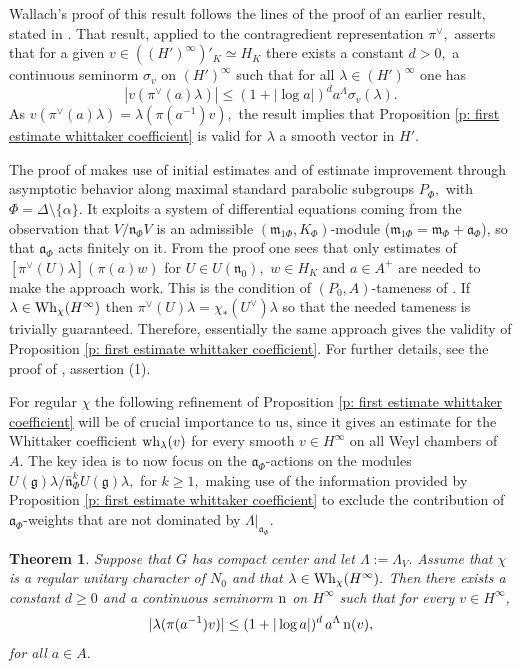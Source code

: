 \documentclass[12pt,a4paper]{article}
\newtheorem{Thm}{Theorem}
\newenvironment{thm}[0]{\begin{Thm}\noindent}%
{\end{Thm}}
\def\ga{\alpha}
\def\gl{\lambda}
\def\gs{\sigma}
\def\gD{\Delta}
\def\got#1{\mathfrak #1}
\def\fa{{\got a}}
\def\fg{{\got g}}
\def\fm{{\got m}}
\def\fn{{\got n}}
\numberwithin{Thm}{section}
\numberwithin{equation}{section}
\def\Wh{{\rm Wh}}
\def\gL{\Lambda}
\numberwithin{equation}{section}
\def\gL{\Lambda}
\def\wh{{\rm wh}}
\def\cchi{\chi}
\def\veec{\vee}%
\begin{document}
Wallach's proof of this result follows the lines of the proof of an earlier result,
stated in  \cite[Thm. 4.3.5]{Wrrg1}. That result, applied to the contragredient
 representation
$\pi^\veec,$  asserts that for a given $v \in ((H')^\infty)'_K\simeq H_K$ there
exists a constant $d > 0,$ a continuous seminorm $\gs_v $ on $(H')^\infty$ such that for all 
$\gl \in (H')^\infty$ one has 
$$ 
|v(\pi^\veec(a)\gl)| \leq ( 1 + |\log a|)^d a^\gL  \gs_v(\gl).
$$ 
As $v(\pi^\veec(a)\gl) = \gl(\pi(a^{-1}) v),$ the result \cite[Thm. 4.3.5]{Wrrg1} implies
that Proposition \ref{p: first estimate whittaker coefficient} is valid for $\gl$ 
a smooth vector in $H'.$ 

The proof of \cite[Thm. 4.3.5]{Wrrg1} makes use of initial estimates and 
of estimate improvement
through asymptotic behavior along maximal standard parabolic subgroups $P_\Phi,$ 
with $\Phi = \gD \setminus \{\ga\}.$ It exploits a system of differential
equations coming from the observation that $V /\fn_\Phi V$ is an admissible
$(\fm_{1\Phi}, K_\Phi)$-module  ($\fm_{1\Phi} = \fm_\Phi +\fa_\Phi$), so that $\fa_\Phi$ acts finitely on it. 
From the proof one sees that only estimates of 
$[\pi^\veec(U)\gl](\pi(a) w) $ for $U \in U(\fn_0),$ $w \in H_K$ and $a \in A^+$ 
are needed to make the approach work. This is the condition of $(P_0, A)$-tameness of \cite[\S 15.2.1]{Wrrg2}.
 If $\gl \in \Wh_\chi(H^\infty)$ then 
$\pi^\veec(U) \gl = \chi_*(U^\veec)\gl$ so that the needed tameness is trivially guaranteed.
Therefore, essentially the same approach gives the validity 
of Proposition \ref{p: first estimate whittaker coefficient}. For further details, see the proof of 
\cite[Thm.~15.2.2]{Wrrg2}, assertion (1). 

For regular $\chi$ the following refinement  of Proposition 
\ref{p: first estimate whittaker coefficient} will be of crucial importance to us, since it gives an estimate for the Whittaker coefficient $\wh_\gl(v)$ for every smooth $v\in H^\infty$ on all Weyl chambers of $A.$ 
The key idea is to now focus on the
$\fa_\Phi$-actions on the modules $U(\fg)\gl/ \bar \fn_\Phi^k U(\fg)\gl,$ for 
$k\geq 1,$ making use of the information provided by 
Proposition \ref{p: first estimate whittaker coefficient} to exclude the contribution 
of $\fa_\Phi$-weights that are not dominated by $\gL|_{\fa_\Phi}.$  

\begin{thm}
\label{t: second estimate whittaker coefficient}
Suppose that $G$ has compact center and let $\gL:= \gL_V.$ 
Assume that $\cchi$ is a regular unitary character of $N_0$ and that 
$\gl \in \Wh_\cchi(H^\infty).$  
Then there exists a constant $d \geq 0$ and a continuous seminorm ${\rm n}$ on 
$H^\infty$ such that for every $v \in H^\infty$, 
$$ 
|\gl(\pi(a^{-1}) v) |\leq ( 1+ |\log a|)^d \,a^\gL \, {\rm n}(v),
$$%
for all $a \in A.$ 
\end{thm}
\end{document}
